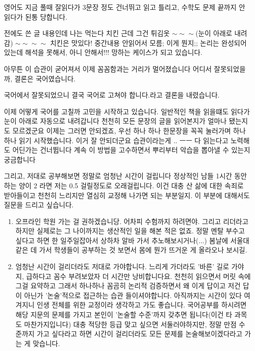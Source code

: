 영어도 지금 풀때 잘읽다가 3문장 정도 건너뛰고 읽고 틀리고, 수학도 문제 끝까지 안읽다가 된통 당합니다.
\vspace{5mm}
 

 

전에도 쓴 글 내용인데 
나는 먹는다 치킨 근데 그건 튀김옷 $\sim\sim\sim$(눈이 아래로 내려감) $\sim\sim\sim\sim$ 치킨은 맛있다!
중간내용 안읽어서 모름; 이게 뭔지;;
논리는 완성되어 있는데 해석을 못해서, 아니 안해서!!! 망하는 케이스가 되고 있습니다.
\vspace{5mm}
 

아무튼 이 습관이 굳어져서 이제 꼼꼼함과는 거리가 멀어졌습니다 
어디서 잘못되었을까, 결론은 국어였습니다.
\vspace{5mm}
 

국어에서 잘못되었으니 결국 국어로 고쳐야 합니다.라고 결론을 내렸습니다.
\vspace{5mm}
 

이제 어떻게 국어를 고칠까 고민을 시작하고 있습니다.
일반적인 책을 읽을떄도 읽다가 눈이 아래로 자동으로 내려갑니다 천천히 모든 문장의 글을 읽어본지가 얼마나 됐는지도 모르겠군요
이제는 그러면 안되겠죠,
우선 하나 하나 한문장을 꼭꼭 눌러가며 하나하나 읽기 시작했습니다.
이거 잘 안되더군요 습관이라는게 .. ㅡㅡ 다 읽는다고 노력해도 어딘가는 건너뜁니다
계속 이 방법을 고수하면서 뿌리부터 악습을 뽑아낼 수 있는지 궁금합니다
\vspace{5mm}
 

그리고,  저대로 공부해보면 정말로 엄청난 시간이 걸립니다
정상적인 남들 1시간 동안 하는 양이 2 라면 저는 0.5 걸릴정도로 오래걸립니다.
이건 대충 산 삶에 대한 속죄로 받아들이고 천천히 느리지만 열심히 교정해 나가면 되는 부분일지.
이 부분에 대해서도 질문을 드리고 싶습니다.


\begin{enumerate}
    \item  오프라인 학원 가는 걸 권하겠습니당. 어차피 수험까지 하려면야.
    그리고 리더라고 하지만 실제로는 그 나이까지는 생산적인 일을 해본 적은 없죠.
    정말 멘탈 부수고 싶다고 하면 한 일주일잡아서 상하차 알바 가서 추노해보시거나(...)
    봄날에 서울대 같은 데 가서 학생들이 공부하는 것 보면서 몸에 뭔가 뜨거운 게 올라오나 보시길.
    \vspace{5mm}
    
    
    \item  엄청난 시간이 걸리더라도 저대로 가야합니다. 느리게 가더라도 '바른' 길로 가야지, 급하다고 꼼수 부려보았자 더 시간만 낭비합니다요.
    천천히 읽으면서 머릿 속에 그걸 요약하고 그래서 하나하나 꼼곰히 논리적 검증하면서 왜 이게 답이고 저건 답이 아닌가
    '논술'적으로 접근하는 습관 들이셔야합니다. 아직까지는 시간이 있다 여겨지니 인생 전체를 위한 교정이라 생각하고 가도 좋습니다.
    국어공부를 하시려면 해당 지문의 문제를 가지고 본인이 '논술할 수준'까지 갖추면 됩니다(이건 타 과목도 마찬가지입니다)
    대충 적당한 등급 맞고 싶으면 서둘러야하지만, 정말 만점 수준까지 가고 싶다라고 하면 시간이 걸리더라도
    모든 문제를 논술해보이겠다라고 가는 게 맞습니다.
\end{enumerate}







